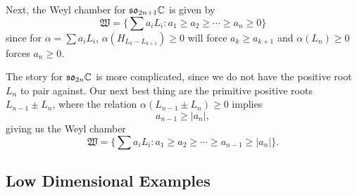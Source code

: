 \documentclass[12pt]{article}
\newcommand{\so}{\mathfrak{so}}
\newcommand{\fW}{\mathfrak{W}}
\begin{document}
Next, the Weyl chamber for $\so_{2n+1} \C$ is given by
\[\fW = \{\sum a_i L_i: a_1\geq a_2 \geq \cdots \geq a_n \geq 0\}\]
since for $\alpha=\sum a_i L_i$, $\alpha(H_{L_k-L_{k+1}}) \geq 0$ will force $a_k\geq a_{k+1}$ and $\alpha(L_n)\geq 0$ forces $a_n\geq 0$.

The story for $\so_{2n} \C$ is more complicated, since we do not have the positive root $L_n$ to pair against. Our next best thing are the primitive positive roots $L_{n-1} \pm L_n$, where the relation $\alpha(L_{n-1} \pm L_n)\geq 0$ implies
\[a_{n-1}\geq |a_n|,\]
giving us the Weyl chamber
\[\fW = \{\sum a_i L_i: a_1\geq a_2 \geq \cdots \geq a_{n-1} \geq |a_n|\}.\]

\subsection{Low Dimensional Examples}
\end{document}
